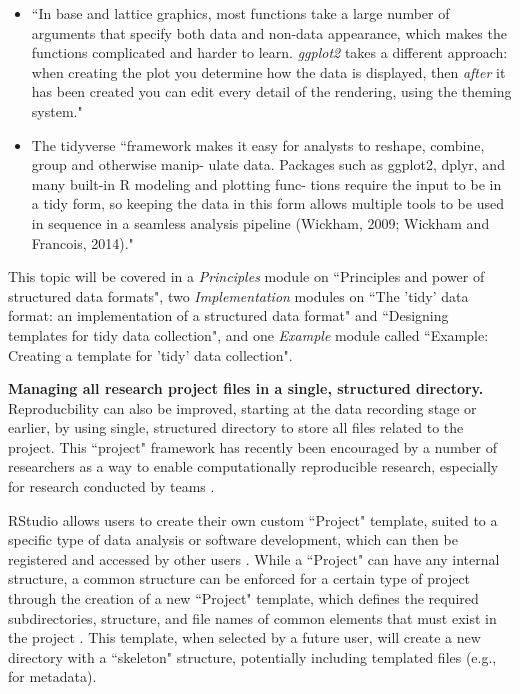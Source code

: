 \documentclass[pdftex,english,11pt,parskip=half]{scrartcl}
\begin{document}
\begin{itemize}
\item ``In base and lattice graphics, most functions take a large number of arguments that specify both data and non-data appearance, which makes the functions complicated and harder to learn. \textit{ggplot2} takes a different approach: when creating the plot you determine how the data is displayed, then \textit{after} it has been created you can edit every detail of the rendering, using the theming system." \cite{wickham2016ggplot2}
\item The tidyverse ``framework makes it easy for analysts to reshape, combine, group and otherwise manip- ulate data. Packages such as ggplot2, dplyr, and many built-in R modeling and plotting func- tions require the input to be in a tidy form, so keeping the data in this form allows multiple tools to be used in sequence in a seamless analysis pipeline (Wickham, 2009; Wickham and Francois, 2014)." \cite{robinson2014broom}
\end{itemize}

This topic will
be covered in a \textit{Principles} module on ``Principles and power of
structured data formats", two \textit{Implementation} modules on ``The 'tidy'
data format: an implementation of a structured data format" and ``Designing
templates for tidy data collection", and one \textit{Example} module called
``Example: Creating a template for 'tidy' data collection".

\textbf{Managing all research project files in a single, structured directory.}
Reproducbility can also be improved, starting at the data recording stage or
earlier, by using single, structured directory to store all files related to the
project. This ``project" framework has recently been encouraged by a number of
researchers as a way to enable computationally reproducible research, especially
for research conducted by teams \cite{marwick2018packaging,
parker2017opinionated, lowndes2017our}. 

RStudio allows users to create their own
custom ``Project" template, suited to a specific type of data analysis or
software development, which can then be registered and accessed by other users
\cite{rstudioprojecttemplate}. While a ``Project" can have any internal
structure, a common structure can be enforced for a certain type of project
through the creation of a new ``Project" template, which defines the required
subdirectories, structure, and file names of common elements that must exist in
the project \cite{rstudioprojecttemplate}. This template, when selected by a
future user, will create a new directory with a ``skeleton" structure,
potentially including templated files (e.g., for metadata).
\end{document}
